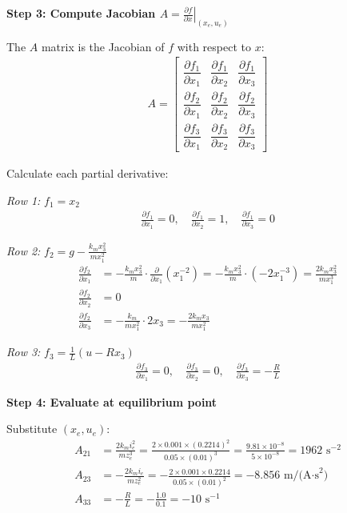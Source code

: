 \documentclass[11pt,a4paper]{article}
\begin{document}
\textbf{Step 3: Compute Jacobian $A = \left.\frac{\partial f}{\partial x}\right|_{(x_e,u_e)}$}

The $A$ matrix is the Jacobian of $f$ with respect to $x$:
\begin{align}
  A = \begin{bmatrix}
    \dfrac{\partial f_1}{\partial x_1} & \dfrac{\partial f_1}{\partial x_2} & \dfrac{\partial f_1}{\partial x_3}\\[0.5em]
    \dfrac{\partial f_2}{\partial x_1} & \dfrac{\partial f_2}{\partial x_2} & \dfrac{\partial f_2}{\partial x_3}\\[0.5em]
    \dfrac{\partial f_3}{\partial x_1} & \dfrac{\partial f_3}{\partial x_2} & \dfrac{\partial f_3}{\partial x_3}
  \end{bmatrix}
\end{align}

Calculate each partial derivative:

\emph{Row 1:} $f_1 = x_2$
\begin{align}
  \frac{\partial f_1}{\partial x_1} = 0, \quad \frac{\partial f_1}{\partial x_2} = 1, \quad \frac{\partial f_1}{\partial x_3} = 0
\end{align}

\emph{Row 2:} $f_2 = g - \frac{k_m x_3^2}{m x_1^2}$
\begin{align}
  \frac{\partial f_2}{\partial x_1} &= -\frac{k_m x_3^2}{m} \cdot \frac{\partial}{\partial x_1}\left(x_1^{-2}\right) = -\frac{k_m x_3^2}{m} \cdot (-2x_1^{-3}) = \frac{2k_m x_3^2}{m x_1^3}\\
  \frac{\partial f_2}{\partial x_2} &= 0\\
  \frac{\partial f_2}{\partial x_3} &= -\frac{k_m}{m x_1^2} \cdot 2x_3 = -\frac{2k_m x_3}{m x_1^2}
\end{align}

\emph{Row 3:} $f_3 = \frac{1}{L}(u - Rx_3)$
\begin{align}
  \frac{\partial f_3}{\partial x_1} = 0, \quad \frac{\partial f_3}{\partial x_2} = 0, \quad \frac{\partial f_3}{\partial x_3} = -\frac{R}{L}
\end{align}

\textbf{Step 4: Evaluate at equilibrium point}

Substitute $(x_e, u_e)$:
\begin{align}
  A_{21} &= \frac{2k_m i_e^2}{m z_e^3} = \frac{2 \times 0.001 \times (0.2214)^2}{0.05 \times (0.01)^3} = \frac{9.81 \times 10^{-8}}{5 \times 10^{-8}} = 1962 \text{ s}^{-2}\\
  A_{23} &= -\frac{2k_m i_e}{m z_e^2} = -\frac{2 \times 0.001 \times 0.2214}{0.05 \times (0.01)^2} = -8.856 \text{ m/(A·s}^2\text{)}\\
  A_{33} &= -\frac{R}{L} = -\frac{1.0}{0.1} = -10 \text{ s}^{-1}
\end{align}
\end{document}
